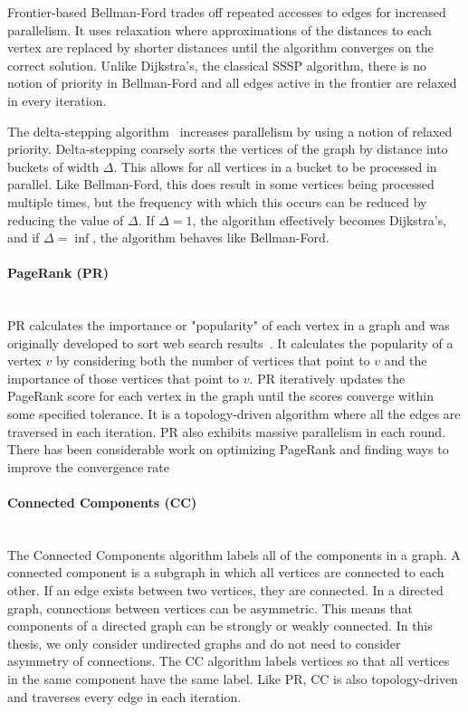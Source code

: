 Frontier-based Bellman-Ford trades off repeated accesses to edges for increased parallelism. 
It uses relaxation where approximations of the distances to each vertex are replaced by shorter distances until the algorithm converges on the correct solution.
Unlike Dijkstra's, the classical SSSP algorithm, there is no notion of priority in Bellman-Ford and all edges active in the frontier are relaxed in every iteration.

The delta-stepping algorithm~\cite{meyer2003delta} increases parallelism by using a notion of relaxed priority. 
Delta-stepping coarsely sorts the vertices of the graph by distance into buckets of width $\Delta$.
This allows for all vertices in a bucket to be processed in parallel. 
Like Bellman-Ford, this does result in some vertices being processed multiple times, but the frequency with which this occurs can be reduced by reducing the value of $\Delta$.
If $\Delta=1$, the algorithm effectively becomes Dijkstra's, and if $\Delta=\inf$, the algorithm behaves like Bellman-Ford. 

\paragraph{PageRank (PR)}\mbox{}\\
PR calculates the importance or "popularity" of each vertex in a graph and was originally developed to sort web search results~\cite{page1999pagerank}.
It calculates the popularity of a vertex $v$ by considering both the number of vertices that point to $v$ and the importance of those vertices that point to $v$.
PR iteratively updates the PageRank score for each vertex in the graph until the scores converge within some specified tolerance.
It is a topology-driven algorithm where all the edges are traversed in each iteration.
PR also exhibits massive parallelism in each round.
There has been considerable work on optimizing PageRank and finding ways to improve the convergence rate~\cite{low2010graphlab,shun2013ligra,kohlschutter2006efficient,berkhin2005survey}

\paragraph{Connected Components (CC)}\mbox{}\\
The Connected Components algorithm labels all of the components in a graph. 
A connected component is a subgraph in which all vertices are connected to each other.
If an edge exists between two vertices, they are connected. 
In a directed graph, connections between vertices can be asymmetric.
This means that components of a directed graph can be strongly or weakly connected. 
In this thesis, we only consider undirected graphs and do not need to consider asymmetry of connections.
The CC algorithm labels vertices so that all vertices in the same component have the same label.
Like PR, CC is also topology-driven and traverses every edge in each iteration.

